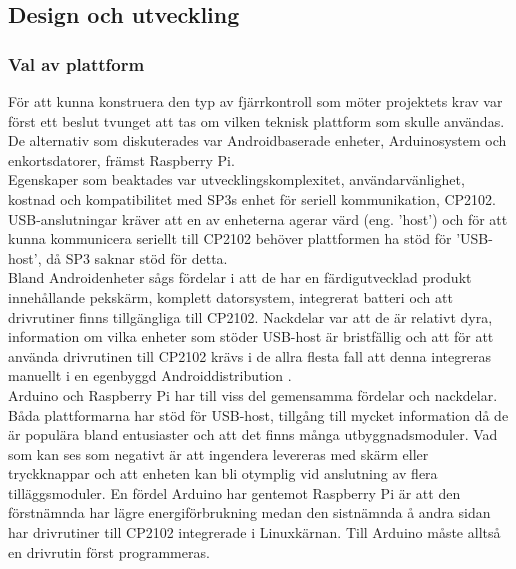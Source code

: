 \documentclass{article}
\begin{document}
        \subsection{Design och utveckling} %
        \label{sub:design_och_utveckling}
        
            \subsubsection{Val av plattform} %
            \label{subsub:val_av_plattform}
            För att kunna konstruera den typ av fjärrkontroll som möter projektets krav var först ett beslut tvunget att tas om vilken teknisk plattform som skulle användas. De alternativ som diskuterades var Androidbaserade enheter, Arduinosystem och enkortsdatorer, främst Raspberry Pi.\\
            
            \noindent Egenskaper som beaktades var utvecklingskomplexitet, användarvänlighet, kostnad och kompatibilitet med SP3s enhet för seriell kommunikation, CP2102. USB-anslutningar kräver att en av enheterna agerar värd (eng. 'host') och för att kunna kommunicera seriellt till CP2102 behöver plattformen ha stöd för 'USB-host', då SP3 saknar stöd för detta. \\
            
            \noindent Bland Androidenheter sågs fördelar i att de har en färdigutvecklad produkt innehållande pekskärm, komplett datorsystem, integrerat batteri och att drivrutiner finns tillgängliga till CP2102. Nackdelar var att de är relativt dyra, information om vilka enheter som stöder USB-host är bristfällig och att för att använda drivrutinen till CP2102 krävs i de allra flesta fall att denna integreras manuellt i en egenbyggd Androiddistribution \cite{SL_AN809}. \\
            
            \enlargethispage{2\baselineskip}
            \noindent Arduino och Raspberry Pi har till viss del gemensamma fördelar och nackdelar. Båda plattformarna har stöd för USB-host, tillgång till mycket information då de är populära bland entusiaster och att det finns många utbyggnadsmoduler. Vad som kan ses som negativt är att ingendera levereras med skärm eller tryckknappar och att enheten kan bli otymplig vid anslutning av flera tilläggsmoduler. En fördel Arduino har gentemot Raspberry Pi är att den förstnämnda har lägre energiförbrukning medan den sistnämnda å andra sidan har drivrutiner till CP2102 integrerade i Linuxkärnan. Till Arduino måste alltså en drivrutin först programmeras. \\
\end{document}
